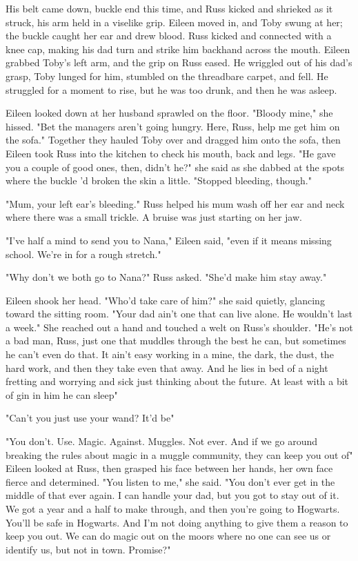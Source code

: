 His belt came down, buckle end this time, and Russ kicked and shrieked as it struck, his arm held in a viselike grip. Eileen moved in, and Toby swung at her; the buckle caught her ear and drew blood. Russ kicked and connected with a knee cap, making his dad turn and strike him backhand across the mouth. Eileen grabbed Toby's left arm, and the grip on Russ eased. He wriggled out of his dad's grasp, Toby lunged for him, stumbled on the threadbare carpet, and fell. He struggled for a moment to rise, but he was too drunk, and then he was asleep.

Eileen looked down at her husband sprawled on the floor. "Bloody mine," she hissed. "Bet the managers aren't going hungry. Here, Russ, help me get him on the sofa." Together they hauled Toby over and dragged him onto the sofa, then Eileen took Russ into the kitchen to check his mouth, back and legs. "He gave you a couple of good ones, then, didn't he?" she said as she dabbed at the spots where the buckle 'd broken the skin a little. "Stopped bleeding, though."

"Mum, your left ear's bleeding." Russ helped his mum wash off her ear and neck where there was a small trickle. A bruise was just starting on her jaw.

"I've half a mind to send you to Nana," Eileen said, "even if it means missing school. We're in for a rough stretch."

"Why don't we both go to Nana?" Russ asked. "She'd make him stay away."

Eileen shook her head. "Who'd take care of him?" she said quietly, glancing toward the sitting room. "Your dad ain't one that can live alone. He wouldn't last a week." She reached out a hand and touched a welt on Russ's shoulder. "He's not a bad man, Russ, just one that muddles through the best he can, but sometimes he can't even do that. It ain't easy working in a mine, the dark, the dust, the hard work, and then they take even that away. And he lies in bed of a night fretting and worrying and sick just thinking about the future. At least with a bit of gin in him he can sleep{\el}"

"Can't you just use your wand? It'd be{\el}"

"You don't. Use. Magic. Against. Muggles. Not ever. And if we go around breaking the rules about magic in a muggle community, they can keep you out of{\el}" Eileen looked at Russ, then grasped his face between her hands, her own face fierce and determined. "You listen to me," she said. "You don't ever get in the middle of that ever again. I can handle your dad, but you got to stay out of it. We got a year and a half to make through, and then you're going to Hogwarts. You'll be safe in Hogwarts. And I'm not doing anything to give them a reason to keep you out. We can do magic out on the moors where no one can see us or identify us, but not in town. Promise?"

